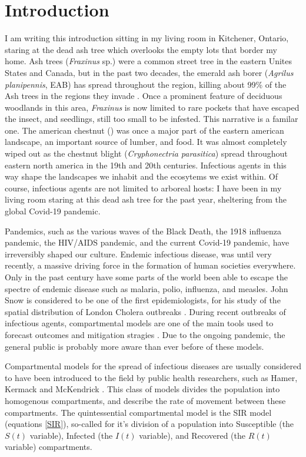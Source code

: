 \chapter{Introduction}

I am writing this introduction sitting in my living room in Kitchener, Ontario, staring at the dead ash tree which overlooks the empty lots that border my home. Ash trees (\textit{Fraxinus} sp.) were a common street tree in the eastern Unites States and Canada, but in the past two decades, the emerald ash borer (\textit{Agrilus planipennis}, EAB) has spread throughout the region, killing about 99\% of the Ash trees in the regions they invade \cite{nrcaneab,herms2014emerald}. Once a prominent feature of deciduous woodlands in this area, \textit{Fraxinus} is now limited to rare pockets that have escaped the insect, and seedlings, still too small to be infested. This narrative is a familar one. The american chestnut () was once a major part of the eastern american landscape, an important source of lumber, and food. It was almost completely wiped out as the chestnut blight (\textit{Cryphonectria parasitica}) spread throughout eastern north america in the 19th and 20th centuries. Infectious agents in this way shape the landscapes we inhabit and the ecosytems we exist within. Of course, infectious agents are not limited to arboreal hosts: I have been in my living room staring at this dead ash tree for the past year, sheltering from the global Covid-19 pandemic. 

Pandemics, such as the various waves of the Black Death, the 1918 influenza pandemic, the HIV/AIDS pandemic, and the current Covid-19 pandemic, have irreversibly shaped our culture. Endemic infectious disease, was until very recently, a massive driving force in the formation of human societies everywhere. Only in the past century have some parts of the world been able to escape the spectre of endemic disease such as malaria, polio, influenza, and measles. John Snow is considered to be one of the first epidemiologists, for his study of the spatial distribution of London Cholera outbreaks \cite{snow1855mode, brauer2019mathematical}. During recent outbreaks of infectious agents, compartmental models are one of the main tools used to forecast outcomes and mitigation stragies \cite{brauer2008compartmental}. Due to the ongoing pandemic, the general public is probably more aware than ever before of these models.

Compartmental models for the spread of infectious diseases are usually considered to have been introduced to the field by public health researchers, such as Hamer, Kermack and McKendrick \cite{hamer1906epidemic, kermack1927contribution, brauer2019mathematical,edelstein2005mathematical}. This class of models divides the population into homogenous compartments, and describe the rate of movement between these compartments. The quintessential compartmental model is the SIR model (equations \ref{SIR}), so-called for it's division of a population into Susceptible (the $S(t)$ variable), Infected (the $I(t)$ variable), and Recovered (the $R(t)$ variable) compartments.

